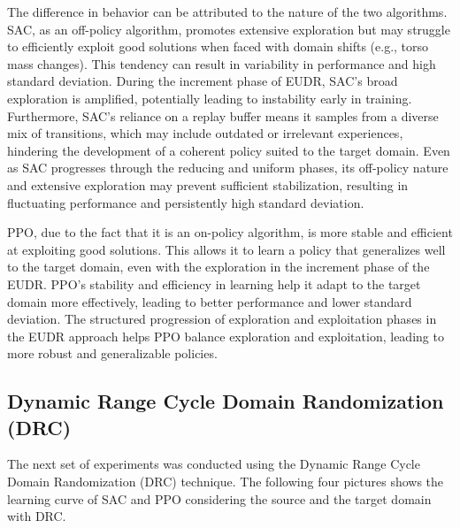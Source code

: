 \documentclass[11pt]{article}
\begin{document}
The difference in behavior can be attributed to the nature of the two algorithms. SAC, as an off-policy algorithm, promotes extensive exploration but may struggle to efficiently exploit good solutions when faced with domain shifts (e.g., torso mass changes). This tendency can result in variability in performance and high standard deviation. During the increment phase of EUDR, SAC's broad exploration is amplified, potentially leading to instability early in training. Furthermore, SAC's reliance on a replay buffer means it samples from a diverse mix of transitions, which may include outdated or irrelevant experiences, hindering the development of a coherent policy suited to the target domain. Even as SAC progresses through the reducing and uniform phases, its off-policy nature and extensive exploration may prevent sufficient stabilization, resulting in fluctuating performance and persistently high standard deviation.

PPO, due to the fact that it is an on-policy algorithm, is more stable and efficient at exploiting good solutions. This allows it to learn a policy that generalizes well to the target domain, even with the exploration in the increment phase of the EUDR. PPO’s stability and efficiency in learning help it adapt to the target domain more effectively, leading to better performance and lower standard deviation. The structured progression of exploration and exploitation phases in the EUDR approach helps PPO balance exploration and exploitation, leading to more robust and generalizable policies.

\subsection{Dynamic Range Cycle Domain Randomization (DRC)}

The next set of experiments was conducted using the Dynamic Range Cycle Domain Randomization (DRC) technique. The following four pictures shows the learning curve of SAC and PPO considering the source and the target domain with DRC.
\end{document}
